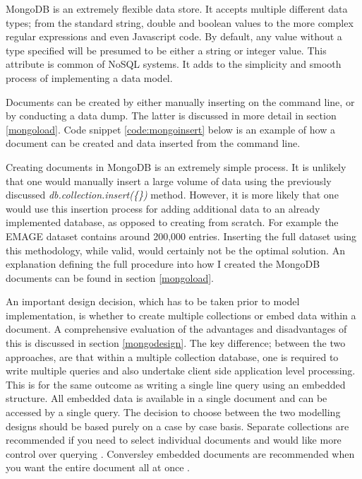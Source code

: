 MongoDB is an extremely flexible data store. It accepts multiple different data types; from the standard string, double and boolean values to the more complex regular expressions and even Javascript code. By default, any value without a type specified will be presumed to be either a string or integer value. This attribute is common of NoSQL systems. It adds to the simplicity and smooth process of implementing a data model.

Documents can be created by either manually inserting on the command line, or by conducting a data dump. The latter is discussed in more detail in section \ref{mongoload}. Code snippet \ref{code:mongoinsert} below is an example of how a document can be created and data inserted from the command line.

Creating documents in MongoDB is an extremely simple process. It is unlikely that one would manually insert a large volume of data using the previously discussed \textit{db.collection.insert(\{\})} method. However, it is more likely that one would use this insertion process for adding additional data to an already implemented database, as opposed to creating from scratch. For example the EMAGE dataset contains around 200,000 entries. Inserting the full dataset using this methodology, while valid, would certainly not be the optimal solution. An explanation defining the full procedure into how I created the MongoDB documents can be found in section \ref{mongoload}.

An important design decision, which has to be taken prior to model implementation, is whether to create multiple collections or embed data within a document. A comprehensive evaluation of the advantages and disadvantages of this is discussed in section \ref{mongodesign}. The key difference; between the two approaches, are that within a multiple collection database, one is required to write multiple queries and also undertake client side application level processing. This is for the same outcome as writing a single line query using an embedded structure. All embedded data is available in a single document and can be accessed by a single query. The decision to choose between the two modelling designs should be based purely on a case by case basis. Separate collections are recommended if you need to select individual documents and would like more control over querying \cite{md}. Conversley embedded documents are recommended when you want the entire document all at once \cite{md}.

